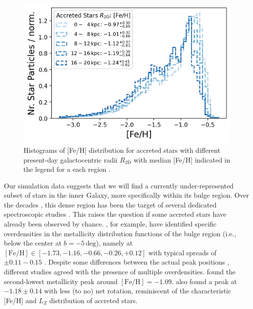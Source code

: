 \documentclass[fleqn,usenatbib]{mnras}
\begin{document}
\begin{figure}
    \centering
    \includegraphics[width=\columnwidth]{figures/fe_h_histograms_r_bins.png}
    \caption{Histograms of {[Fe/H]} distribution for accreted stars with different present-day galactocentric radii $R_\mathrm{2D}$ with median {[Fe/H]} indicated in the legend for a each region \href{https://github.com/svenbuder/gse_nihaouhd/tree/main/figures}{\faGithub}.}
    \label{fig:fe_h_histograms_r_bins}
\end{figure}

Our simulation data suggests that we will find a currently under-represented subset of stars in the inner Galaxy, more specifically within its bulge region. Over the decades \citep[see for example][for a review]{Barbuy2018}, this dense region has been the target of several dedicated spectroscopic studies \citep[for example][]{Ness2013, Bensby2017, Lucey2019}. This raises the question if some accreted stars have already been observed by chance. \citet{Ness2013, Ness2013b}, for example, have identified specific overdensities in the metallicity distribution functions of the bulge region (i.e., below the center at $b = -5\,\mathrm{deg}$), namely at $\mathrm{[Fe/H]} \in [-1.73, -1.16, -0.66, -0.26, +0.12]$ with typical spreads of $\pm0.11-0.15$ \citep[see also][]{Portail2017}. Despite some differences between the actual peak positions \citep[compare for example Fig.~4 by][]{Barbuy2018}, different studies agreed with the presence of multiple overdensities. \citet{Bensby2017} found the second-lowest metallicity peak around $\mathrm{[Fe/H]} = -1.09$. \citet{Portail2017} also found a peak at $-1.18\pm 0.14$ with less (to no) net rotation, reminiscent of the characteristic [Fe/H] and $L_Z$ distribution of accreted stars. 
\end{document}
